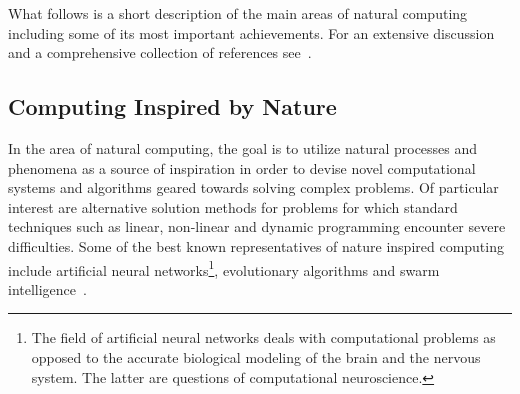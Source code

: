 	What follows is a short description of the main areas of natural computing including some of its most important achievements. For an extensive discussion and a comprehensive collection of references see~\cite{de2007fundamentals}.

	\FloatBarrier

	\subsection{Computing Inspired by Nature}

		In the area of natural computing, the goal is to utilize natural processes and phenomena as a source of inspiration in order to devise novel computational systems and algorithms geared towards solving complex problems. Of particular interest are alternative solution methods for problems for which standard techniques such as linear, non-linear and dynamic programming encounter severe difficulties. Some of the best known representatives of nature inspired computing include artificial neural networks\footnote{The field of artificial neural networks deals with computational problems as opposed to the accurate biological modeling of the brain and the nervous system. The latter are questions of computational neuroscience.}, evolutionary algorithms and swarm intelligence~\cite{de2007fundamentals}.

		\newpage

